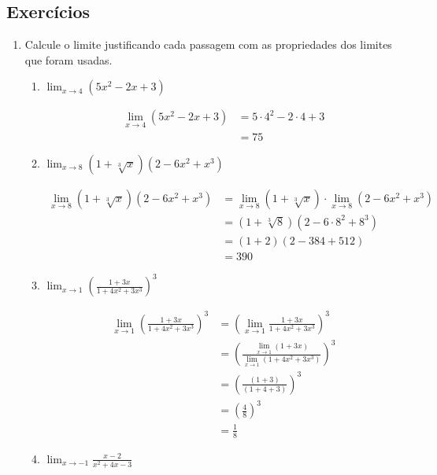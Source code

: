 \documentclass[a4paper, 12pt]{article}
\begin{document}
\subsection{Exercícios}
\begin{enumerate}
    \item Calcule o limite justificando cada passagem com as propriedades dos limites que foram usadas.
    
    \begin{enumerate}
        \item $\lim_{x \to 4}(5x^2 - 2x + 3)$
        
        \begin{align*}
            \lim_{x \to 4}(5x^2 - 2x + 3) &= 5 \cdot 4^2 - 2 \cdot 4 + 3 \tag*{[l. pol.]}\\
            &= 75
        \end{align*}

        \item $\lim_{x \to 8} (1 + \sqrt[3]{x})(2-6x^2 + x^3)$
        
        \begin{align*}
            \lim_{x \to 8} (1 + \sqrt[3]{x})(2-6x^2 + x^3) &= \lim_{x \to 8}(1 + \sqrt[3]{x}) \cdot \lim_{x \to 8}(2-6x^2 + x^3) \tag*{[l. prod.]}\\
            &= (1 + \sqrt[3]{8}) (2-6 \cdot 8^2 + 8^3) \tag*{[l. pol.]}\\
            &= (1 + 2) (2-384 + 512) \\
            &= 390
        \end{align*}

        \item $\lim_{x \to 1} \left (\frac{1 + 3x}{1 + 4x^2 + 3x^3} \right)^3$
        
        \begin{align*}
            \lim_{x \to 1} \left (\frac{1 + 3x}{1 + 4x^2 + 3x^3} \right)^3 &= \left (\lim_{x \to 1} \frac{1 + 3x}{1 + 4x^2 + 3x^3} \right)^3 \tag*{[l. pot.]}\\
            &= \left (\frac{\lim_{x \to 1}(1 + 3x)}{\lim_{x \to 1}(1 + 4x^2 + 3x^3)} \right)^3 \tag*{[l. quo.]}\\
            &= \left (\frac{(1 + 3)}{(1 + 4 + 3)} \right)^3 \tag*{[l. pol.]}\\
            &= \left( \frac{4}{8} \right)^3\\
            &= \frac{1}{8}
        \end{align*}

        \item $\lim_{x \to -1} \frac{x-2}{x^2 + 4x - 3}$
        

\end{enumerate}
\end{enumerate}
\end{document}
